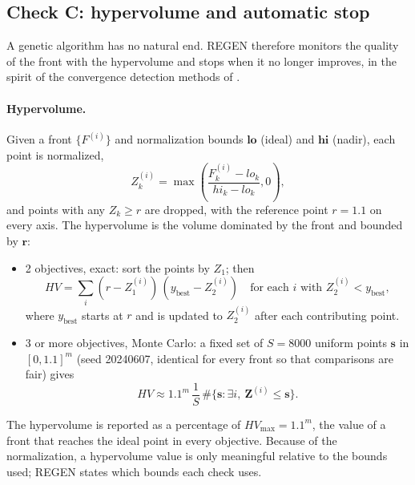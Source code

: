 \subsection{Check C: hypervolume and automatic stop}
\label{sec:ch08-checkC}
A genetic algorithm has no natural end. REGEN therefore monitors the quality of the front with the hypervolume
\citep{zitzler1999,lu2013} and stops when it no longer improves, in the spirit of the convergence detection methods
of \citet{trautmann2009}.

\paragraph{Hypervolume.} Given a front $\{F^{(i)}\}$ and normalization bounds $\mathbf{lo}$ (ideal) and
$\mathbf{hi}$ (nadir), each point is normalized,
\begin{equation}
Z^{(i)}_k=\max\!\left(\frac{F^{(i)}_k-lo_k}{hi_k-lo_k},0\right),
\label{eq:ch08-hvnorm}
\end{equation}
and points with any $Z_k\ge r$ are dropped, with the reference point $r=1.1$ on every axis. The hypervolume is the
volume dominated by the front and bounded by $\mathbf r$:
\begin{itemize}
  \item 2 objectives, exact: sort the points by $Z_1$; then
        \begin{equation}
        HV=\sum_i (r-Z^{(i)}_1)\,(y_\text{best}-Z^{(i)}_2)\quad\text{for each } i\text{ with }Z^{(i)}_2<y_\text{best},
        \label{eq:ch08-hv2}
        \end{equation}
        where $y_\text{best}$ starts at $r$ and is updated to $Z^{(i)}_2$ after each contributing point.
  \item 3 or more objectives, Monte Carlo: a fixed set of $S=8000$ uniform points $\mathbf s$ in $[0,1.1]^m$
        (seed 20240607, identical for every front so that comparisons are fair) gives
        \begin{equation}
        HV\approx1.1^m\,\frac{1}{S}\,\#\{\mathbf s:\exists i,\ \mathbf Z^{(i)}\le\mathbf s\}.
        \label{eq:ch08-hvmc}
        \end{equation}
\end{itemize}
The hypervolume is reported as a percentage of $HV_\text{max}=1.1^m$, the value of a front that reaches the ideal
point in every objective. Because of the normalization, a hypervolume value is only meaningful relative to the
bounds used; REGEN states which bounds each check uses.

